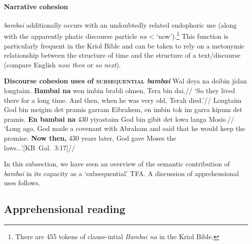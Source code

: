  \paragraph{Narrative cohesion} \textit{bambai} additionally occurs with an undoubtedly related endo\-phoric use (along with the apparently phatic discourse particle \textit{na} < `now').\footnote{There are 455 tokens of clause-intial \textit{Bambai na} in the Kriol Bible.} This function is particularly frequent in the Kriol Bible and can be taken to rely on a metonymic relationship between the structure of time and the structure of a text/discourse (compare English \textit{now then} or \textit{so next}).
 
 
 \pex \textbf{Discourse cohesion uses of \textsc{subsequential} \textit{bambai}}
 \a\begingl\gla Wal deya na deibin jidan longtaim. \textbf{Bambai na} wen imbin brabli olmen, Tera bin dai.//
 \glft`So they lived there for a long time. And then, when he was very old, Terah died.'\trailingcitation{[KB~Jen.~11.32]}//\endgl
 \a\begingl\gla Longtaim God bin meigim det pramis garram Eibrahem, en imbin tok im garra kipum det pramis. \textbf{En bambai na} 430 yiyastaim God bin gibit det lowa langa Mosis.//
 \glft`Long ago, God made a covenant with Abraham and said that he would keep the promise.\textbf{ Now then,} 430 years later, God gave Moses the laws...'\trailingcitation[{KB~Gal.~3:17]}//\endgl
 
 \xe
 
 

In this subsection, we have seen an overview of the semantic contribution of \textit{bambai} in its capacity as a `subsequential' TFA. A discussion of apprehensional uses follows. %


	\subsection{Apprehensional reading}\label{dataSapp}



